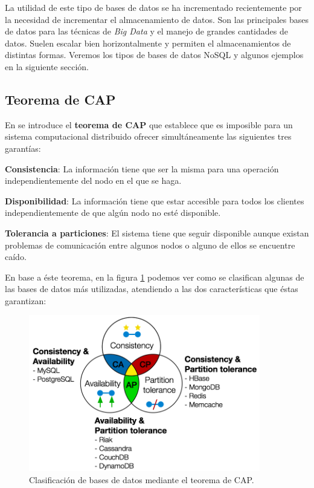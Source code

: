 La utilidad de este tipo de bases de datos se ha incrementado recientemente por la necesidad de incrementar el almacenamiento de datos. Son las principales bases de datos para las técnicas de \textit{Big Data} y el manejo de grandes cantidades de datos. Suelen escalar bien horizontalmente y permiten el almacenamientos de distintas formas. Veremos los tipos de bases de datos NoSQL y algunos ejemplos en la siguiente sección.

\subsection{Teorema de CAP}
En \cite{captheorem} se introduce el \textbf{teorema de CAP} que establece que es imposible para un sistema computacional distribuido ofrecer simultáneamente las siguientes tres garantías:

\textbf{Consistencia}: La información tiene que ser la misma para una operación independientemente del nodo en el que se haga.

\textbf{Disponibilidad}: La información tiene que estar accesible para todos los clientes independientemente de que algún nodo no esté disponible.

\textbf{Tolerancia a particiones}: El sistema tiene que seguir disponible aunque existan problemas de comunicación entre algunos nodos o alguno de ellos se encuentre caído.

En base a éste teorema, en la figura \ref{fig:captheorem} podemos ver como se clasifican algunas de las bases de datos más utilizadas, atendiendo a las dos características que éstas garantizan:

\begin{figure}[h]
  \centering
  \includegraphics[width=0.9\textwidth]{gfx/CAPTheorem.png}
  \caption{\label{fig:captheorem}Clasificación de bases de datos mediante el teorema de CAP.}
\end{figure}

